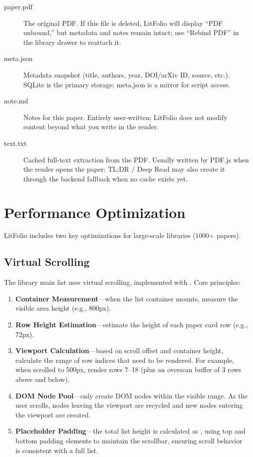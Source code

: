 \begin{description}
  \item[paper.pdf] The original PDF. If this file is deleted, LitFolio will display
    ``PDF unbound,'' but metadata and notes remain intact; use ``Rebind PDF'' in the
    library drawer to reattach it.
  \item[meta.json] Metadata snapshot (title, authors, year, DOI/arXiv ID, source, etc.).
    SQLite is the primary storage; meta.json is a mirror for script access.
  \item[note.md] Notes for this paper. Entirely user-written; LitFolio does not modify
    content beyond what you write in the reader.
  \item[text.txt] Cached full-text extraction from the PDF. Usually written by PDF.js
    when the reader opens the paper; TL;DR / Deep Read may also create it through
    the backend  fallback when no cache exists yet.
\end{description}

\section{Performance Optimization}

LitFolio includes two key optimizations for large-scale libraries (1000+ papers).

\subsection{Virtual Scrolling}

The library main list uses virtual scrolling, implemented with
. Core principles:

\begin{enumerate}
  \item \textbf{Container Measurement}---when the list container mounts, measure the
    visible area height (e.g., 800px).
  \item \textbf{Row Height Estimation}---estimate the height of each paper card row
    (e.g., 72px).
  \item \textbf{Viewport Calculation}---based on scroll offset and container height,
    calculate the range of row indices that need to be rendered. For example, when
    scrolled to 500px, render rows 7--18 (plus an overscan buffer of 3 rows above
    and below).
  \item \textbf{DOM Node Pool}---only create DOM nodes within the visible range. As the
    user scrolls, nodes leaving the viewport are recycled and new nodes entering the
    viewport are created.
  \item \textbf{Placeholder Padding}---the total list height is calculated as
    , using top and bottom padding elements to
    maintain the scrollbar, ensuring scroll behavior is consistent with a full list.
\end{enumerate}

